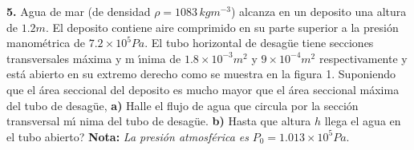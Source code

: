 \documentclass{article}
\begin{document}

\textbf{5. }Agua de mar (de densidad $\rho =1083\,kgm^{-3}$) alcanza en un
deposito una altura de $1.2m.$ El deposito contiene aire comprimido en su
parte superior a la presi\'{o}n manom\'{e}trica de $7.2\times 10^{5}Pa.$ El
tubo horizontal de desag\"{u}e tiene secciones transversales m\'{a}xima y m%
\'{\i}nima de $1.8\times 10^{-3}m^{2}$ y $9\times 10^{-4}m^{2}$
respectivamente y est\'{a} abierto en su extremo derecho como se muestra en
la figura 1. Suponiendo que el \'{a}rea seccional del deposito es mucho
mayor que el \'{a}rea seccional m\'{a}xima del tubo de desag\"{u}e, \textbf{%
a) }Halle el flujo de agua que circula por la secci\'{o}n transversal m\'{\i}%
nima del tubo de desag\"{u}e. \textbf{b) }Hasta que altura $h$ llega el agua
en el tubo abierto? \textbf{Nota: }\emph{La presi\'{o}n atmosf\'{e}rica es }$%
P_{0}=1.013\times 10^{5}Pa.$
\end{document}
